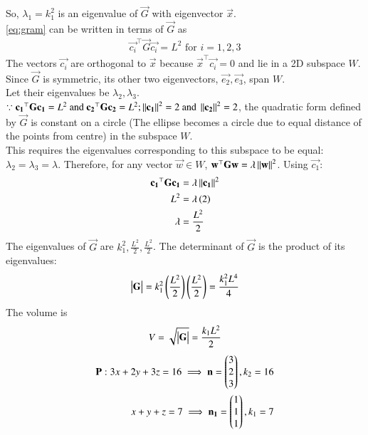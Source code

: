 \documentclass[journal]{IEEEtran}
\begin{document}
So, $\lambda_1 = k_1^2$ is an eigenvalue of $\vec{G}$ with eigenvector $\vec{x}$. \\
\eqref{eq:gram} can be written in terms of $\vec{G}$ as
\begin{align}
    \vec{c_i}^\top \vec{G} \vec{c_i} = L^2 \text{ for } i=1,2,3
\end{align}
The vectors $\vec{c_i}$ are orthogonal to $\vec{x}$ because $\vec{x}^\top\vec{c_i}=0$ and lie in a 2D subspace $W$. \\
Since $\vec{G}$ is symmetric, its other two eigenvectors, $\vec{e_2}, \vec{e_3}$, span $W$. \\
Let their eigenvalues be $\lambda_2, \lambda_3$. \\
$\because \mathbf{c_1}^\top\mathbf{G}\mathbf{c_1} = L^2\text{ and }\mathbf{c_2}^\top\mathbf{G}\mathbf{c_2} = L^2; \left\lVert\mathbf{c_1}\right\rVert^2 = 2\text{ and }\left\lVert\mathbf{c_2}\right\rVert^2 = 2$, the quadratic form defined by $\vec{G}$ is constant on a circle (The ellipse becomes a circle due to equal distance of the points from centre) in the subspace $W$. \\
This requires the eigenvalues corresponding to this subspace to be equal: $\lambda_2 = \lambda_3 = \lambda$.
Therefore, for any vector $\vec{w} \in W$, $\mathbf{w}^\top\mathbf{G}\mathbf{w} = \lambda\left\lVert\mathbf{w}\right\rVert^2$.
Using $\vec{c_1}$:
\begin{align}
    \mathbf{c_1}^\top\mathbf{G}\mathbf{c_1} &= \lambda\left\lVert\mathbf{c_1}\right\rVert^2 \\
    L^2 &= \lambda\left(2\right) \\
    \lambda &= \frac{L^2}{2}
\end{align}
The eigenvalues of $\vec{G}$ are $k_1^2, \frac{L^2}{2}, \frac{L^2}{2}$. The determinant of $\vec{G}$ is the product of its eigenvalues:
\begin{align}
    \begin{vmatrix}\mathbf{G}\end{vmatrix} = k_1^2 \left(\frac{L^2}{2}\right) \left(\frac{L^2}{2}\right) = \frac{k_1^2 L^4}{4}
\end{align}
The volume is 
\begin{align}
    V = \sqrt{\begin{vmatrix}\mathbf{G}\end{vmatrix}} = \frac{k_1 L^2}{2}
\end{align}
\begin{align}
    \mathbf{P}: 3x+2y+3z=16 \implies \mathbf{n} = \begin{pmatrix}3 \\ 2 \\ 3\end{pmatrix}, k_2=16 \\
    x+y+z=7 \implies \mathbf{n_1} = \begin{pmatrix}1 \\ 1 \\ 1\end{pmatrix}, k_1=7 \\
\end{align}
\end{document}
